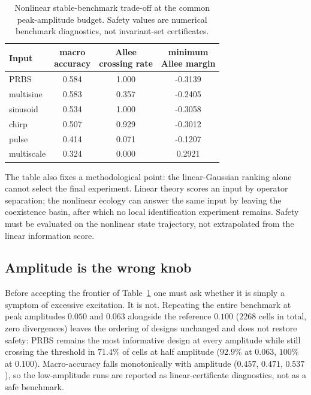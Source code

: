 \begin{table}[htbp]
\centering
\caption{Nonlinear stable-benchmark trade-off at the common peak-amplitude budget. Safety values are numerical benchmark diagnostics, not invariant-set certificates.}
\label{tab:benchmark-safety}
\footnotesize
\begin{tabular}{lccc}
\hline
\textbf{Input} & \shortstack{\textbf{macro}\\\textbf{accuracy}} & \shortstack{\textbf{Allee}\\\textbf{crossing rate}} & \shortstack{\textbf{minimum}\\\textbf{Allee margin}}\\
\hline
PRBS       & 0.584 & 1.000 & -0.3139\\
multisine  & 0.583 & 0.357 & -0.2405\\
sinusoid   & 0.534 & 1.000 & -0.3058\\
chirp      & 0.507 & 0.929 & -0.3012\\
pulse      & 0.414 & 0.071 & -0.1207\\
multiscale & 0.324 & 0.000 &  0.2921\\
\hline
\end{tabular}
\end{table}

The table also fixes a methodological point: the linear-Gaussian ranking alone cannot select the final experiment. Linear theory scores an input by operator separation; the nonlinear ecology can answer the same input by leaving the coexistence basin, after which no local identification experiment remains. Safety must be evaluated on the nonlinear state trajectory, not extrapolated from the linear information score.

\subsection{Amplitude is the wrong knob}
\label{subsec:amplitude}
Before accepting the frontier of Table~\ref{tab:benchmark-safety} one must ask whether it is simply a symptom of excessive excitation. It is not. Repeating the entire benchmark at peak amplitudes $0.050$ and $0.063$ alongside the reference $0.100$ ($2268$ cells in total, zero divergences) leaves the ordering of designs unchanged and does not restore safety: PRBS remains the most informative design at every amplitude while still crossing the threshold in $71.4\%$ of cells at half amplitude ($92.9\%$ at $0.063$, $100\%$ at $0.100$). Macro-accuracy falls monotonically with amplitude ($0.457$, $0.471$, $0.537$), so the low-amplitude runs are reported as linear-certificate diagnostics, not as a safe benchmark.

